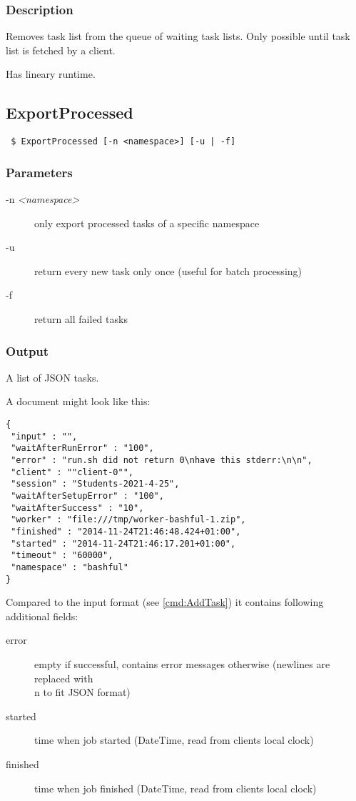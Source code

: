\documentclass[a4paper,11pt]{article}
\begin{document}
\subsubsection{Description}
Removes task list from the queue of waiting task lists. Only possible until task list is fetched by a client.

Has lineary runtime.

\newpage


\subsection{ExportProcessed\label{cmd:ExportProcessed}}
\begin{verbatim}
 $ ExportProcessed [-n <namespace>] [-u | -f]
\end{verbatim}

\subsubsection{Parameters}
\begin{description}
\item[-n \textit{<namespace>}] only export processed tasks of a specific namespace
\item[-u] return every new task only once (useful for batch processing)
\item[-f] return all failed tasks
\end{description}

\subsubsection{Output}
A list of JSON tasks.

A document might look like this:

\begin{verbatim}
{
 "input" : "",
 "waitAfterRunError" : "100",
 "error" : "run.sh did not return 0\nhave this stderr:\n\n",
 "client" : ""client-0"",
 "session" : "Students-2021-4-25",
 "waitAfterSetupError" : "100",
 "waitAfterSuccess" : "10",
 "worker" : "file:///tmp/worker-bashful-1.zip",
 "finished" : "2014-11-24T21:46:48.424+01:00",
 "started" : "2014-11-24T21:46:17.201+01:00",
 "timeout" : "60000",
 "namespace" : "bashful"
}
\end{verbatim}

Compared to the input format (see \ref{cmd:AddTask}) it contains following additional fields:
\begin{description}
\item[error] empty if successful, contains error messages otherwise (newlines are replaced with \\n to fit JSON format)
\item[started] time when job started (DateTime, read from clients local clock)
\item[finished] time when job finished (DateTime, read from clients local clock)
\end{description}
\end{document}

